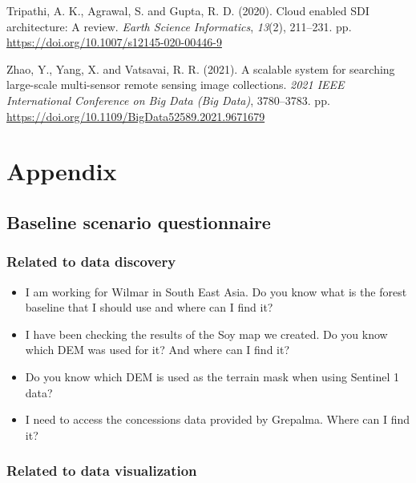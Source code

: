 \documentclass[
  oneside,
  open=any]{scrbook}
\providecommand{\tightlist}{%
  \setlength{\itemsep}{0pt}\setlength{\parskip}{0pt}}\usepackage{longtable,booktabs,array}
\newlength{\cslhangindent}
\newenvironment{CSLReferences}[2] %
 {\begin{list}{}{%
  \setlength{\itemindent}{0pt}
  \setlength{\leftmargin}{0pt}
  \setlength{\parsep}{0pt}
  \ifodd #1
   \setlength{\leftmargin}{\cslhangindent}
   \setlength{\itemindent}{-1\cslhangindent}
  \fi
  \setlength{\itemsep}{#2\baselineskip}}}
 {\end{list}}
\begin{document}
\begin{CSLReferences}{1}{0}
Tripathi, A. K., Agrawal, S. and Gupta, R. D. (2020). Cloud enabled
{SDI} architecture: A review. \emph{Earth Science Informatics},
\emph{13}(2), 211--231. pp.
\url{https://doi.org/10.1007/s12145-020-00446-9}

Zhao, Y., Yang, X. and Vatsavai, R. R. (2021). A scalable system for
searching large-scale multi-sensor remote sensing image collections.
\emph{2021 {IEEE} International Conference on Big Data (Big Data)},
3780--3783. pp. \url{https://doi.org/10.1109/BigData52589.2021.9671679}

\end{CSLReferences}

\chapter{Appendix}\label{appendix}

\section{Baseline scenario questionnaire}\label{sec-baseline-q}

\subsection*{Related to data discovery}\label{related-to-data-discovery}

\begin{itemize}
\tightlist
\item
  I am working for Wilmar in South East Asia. Do you know what is the
  forest baseline that I should use and where can I find it?
\item
  I have been checking the results of the Soy map we created. Do you
  know which DEM was used for it? And where can I find it?
\item
  Do you know which DEM is used as the terrain mask when using Sentinel
  1 data?
\item
  I need to access the concessions data provided by Grepalma. Where can
  I find it?
\end{itemize}

\subsection*{Related to data
visualization}\label{related-to-data-visualization}
\end{document}
